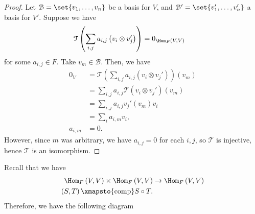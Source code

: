 \documentclass[10pt]{mypackage}
\begin{document}
\begin{proof}
    Let $\mathcal{B} = \set{v_1,\dots,v_n}$ be a basis for $V$, and $\mathcal{B}' = \set{v_1',\dots,v_n'}$ a basis for $V'$. Suppose we have
    \begin{align*}
      \mathcal{T}\left(\sum_{i,j}a_{i,j}\left(v_{i}\otimes v_{j}'\right)\right) &= 0_{\Hom_{F}\left(V,V\right)}
    \end{align*}
    for some $a_{i,j}\in F$. Take $v_m\in \mathcal{B}$. Then, we have
    \begin{align*}
      0_{V} &= \mathcal{T}\left(\sum_{i,j}a_{i,j}\left(v_i\otimes v_j'\right)\right)\left(v_{m}\right)\\
            &= \sum_{i,j}a_{i,j}\mathcal{T}\left(v_{i}\otimes v_{j}'\right)\left(v_{m}\right)\\
            &= \sum_{i,j}a_{i,j}v_{j}'\left(v_m\right)v_i\\
            &= \sum_{i} a_{i,m}v_i,\\
      a_{i,m} &= 0.
    \end{align*}
    However, since $m$ was arbitrary, we have $a_{i,j} = 0$ for each $i,j$, so $\mathcal{T}$ is injective, hence $\mathcal{T}$ is an isomorphism.
  \end{proof}
  Recall that we have
  \begin{align*}
    \Hom_{F}\left(V,V\right) \times \Hom_{F}\left(V,V\right) &\rightarrow \Hom_{F}\left(V,V\right)\\
    \left(S,T\right) \xmapsto{\text{comp}} S\circ T.
  \end{align*}
  Therefore, we have the following diagram
  \begin{center}
  \end{center}
\end{document}
